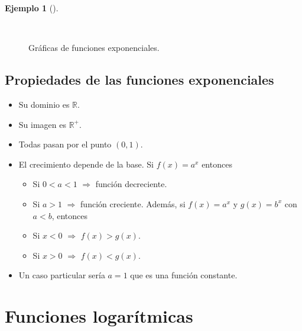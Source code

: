 \documentclass[
  a4paper,
]{scrreport}
\providecommand{\tightlist}{%
  \setlength{\itemsep}{0pt}\setlength{\parskip}{0pt}}\usepackage{longtable,booktabs,array}
\theoremstyle{plain}
\theoremstyle{plain}
\theoremstyle{definition}
\theoremstyle{definition}
\newtheorem{example}{Ejemplo}[chapter]
\theoremstyle{plain}
\theoremstyle{remark}
\begin{document}
\leavevmode{}%
\begin{example}[]\label{exm-funcion-exponencial}

~

\begin{figure}

{\centering 



}

\caption{Gráficas de funciones exponenciales.}

\end{figure}

\end{example}

\hypertarget{propiedades-de-las-funciones-exponenciales}{%
\subsection{Propiedades de las funciones
exponenciales}\label{propiedades-de-las-funciones-exponenciales}}

\begin{itemize}
\tightlist
\item
  Su dominio es \(\mathbb{R}\).
\item
  Su imagen es \(\mathbb{R}^+\).
\item
  Todas pasan por el punto \((0,1)\).
\item
  El crecimiento depende de la base. Si \(f(x)=a^x\) entonces

  \begin{itemize}
  \tightlist
  \item
    Si \(0<a<1\) \(\Rightarrow\) función decreciente.
  \item
    Si \(a>1\) \(\Rightarrow\) función creciente. Además, si
    \(f(x)=a^x\) y \(g(x)=b^x\) con \(a<b\), entonces
  \item
    Si \(x<0\) \(\Rightarrow\) \(f(x)>g(x)\).
  \item
    Si \(x>0\) \(\Rightarrow\) \(f(x)<g(x)\).
  \end{itemize}
\item
  Un caso particular sería \(a=1\) que es una función constante.
\end{itemize}

\hypertarget{funciones-logaruxedtmicas}{%
\section{Funciones logarítmicas}\label{funciones-logaruxedtmicas}}
\end{document}
